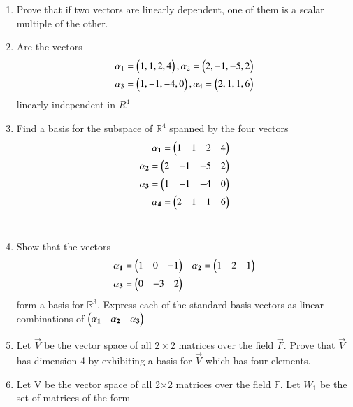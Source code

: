 \renewcommand{\theequation}{\theenumi}
\renewcommand{\thefigure}{\theenumi}
\begin{enumerate}[label=\thesubsection.\arabic*.,ref=\thesubsection.\theenumi]
\item Prove that if two vectors are linearly dependent, one of them is a scalar multiple of the other.
%
\\
\solution

%
\item Are the vectors 
\begin{align}
\alpha{_1}=\begin{pmatrix}1,1,2,4\end{pmatrix} , \alpha{_2}=\begin{pmatrix}2,-1,-5,2\end{pmatrix} \\
\alpha{_3}=\begin{pmatrix}1,-1,-4,0\end{pmatrix} , \alpha{_4}=\begin{pmatrix}2,1,1,6\end{pmatrix}
\end{align}
linearly independent in $R^{4}$
%
\\
\solution

%
\item Find a basis for the subspace of $\mathbb{R}^{4}$ spanned by the four vectors
\begin{align}
\mathbf{\alpha_1} = \begin{pmatrix}1&1&2&4\end{pmatrix}\\
\mathbf{\alpha_2} = \begin{pmatrix}2&-1&-5&2\end{pmatrix}\\
\mathbf{\alpha_3} = \begin{pmatrix}1&-1&-4&0\end{pmatrix}\\
\mathbf{\alpha_4} = \begin{pmatrix}2&1&1&6\end{pmatrix}
\end{align}
%
\\
\solution

\item Show that the vectors 
\begin{align}
& \mathbf{\alpha_1} = \begin{pmatrix}1 & 0 & -1\end{pmatrix} & \mathbf{\alpha_2} = \begin{pmatrix}1 & 2 & 1 \end{pmatrix} \\
& \mathbf{\alpha_3} = \begin{pmatrix}0 & -3 & 2\end{pmatrix}
\end{align}
form a basis for $\mathbb{R}^3$. Express each of the standard basis vectors as linear combinations
of $\begin{pmatrix}\mathbf{\alpha_1} &  \mathbf{\alpha_2} & \mathbf{\alpha_3}\end{pmatrix}$
\\
\solution

%
\item 	Let $\vec{V}$ be the vector space of all $2\times 2$ matrices over the field $\vec{F}$. Prove that $\vec{V}$ has dimension 4 by exhibiting a basis for $\vec{V}$ which has four elements.
%
\\
\solution

\item Let V be the vector space of all 2$\times$2 matrices over the field $\mathbb{F}$. Let $W_1$ be the set of matrices of the form 

\end{enumerate}
